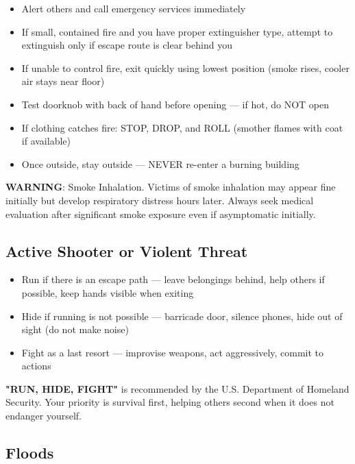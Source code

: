 \begin{itemize}
  \item Alert others and call emergency services immediately
  \item If small, contained fire and you have proper extinguisher type, attempt to extinguish only if escape route is clear behind you
  \item If unable to control fire, exit quickly using lowest position (smoke rises, cooler air stays near floor)
  \item Test doorknob with back of hand before opening — if hot, do NOT open
  \item If clothing catches fire: STOP, DROP, and ROLL (smother flames with coat if available)
  \item Once outside, stay outside — NEVER re-enter a burning building
\end{itemize}

\noindent\textbf{WARNING}: Smoke Inhalation. Victims of smoke inhalation may appear fine initially but develop respiratory distress hours later. Always seek medical evaluation after significant smoke exposure even if asymptomatic initially.

\subsection{Active Shooter or Violent Threat}

\begin{itemize}
  \item Run if there is an escape path — leave belongings behind, help others if possible, keep hands visible when exiting
  \item Hide if running is not possible — barricade door, silence phones, hide out of sight (do not make noise)
  \item Fight as a last resort — improvise weapons, act aggressively, commit to actions
\end{itemize}

\noindent\textbf{"RUN, HIDE, FIGHT"} is recommended by the U.S. Department of Homeland Security. Your priority is survival first, helping others second when it does not endanger yourself.

\subsection{Floods}

